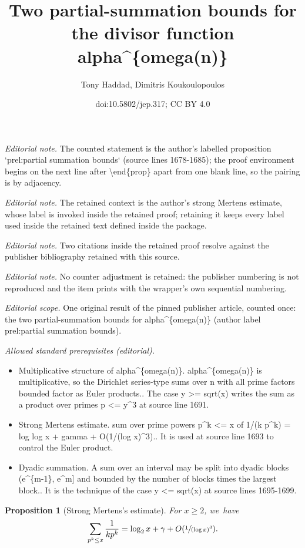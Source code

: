 \documentclass[10pt,a4paper]{article}
\title{Two partial-summation bounds for the divisor function alpha\textasciicircum{}\{omega(n)\}}
\author{Tony Haddad, Dimitris Koukoulopoulos}
\date{doi:10.5802/jep.317; CC BY 4.0}
\newcommand{\bigO}[1]{O(#1)}
\theoremstyle{plain}
\newtheorem{prop}[cor]{Proposition}
\theoremstyle{definition}
\begin{document}
\maketitle
\noindent\textit{Editorial note.} The counted statement is the author's labelled proposition `prel:partial summation bounds` (source lines 1678-1685); the proof environment begins on the next line after \textbackslash{}end\{prop\} apart from one blank line, so the pairing is by adjacency.\par\medskip
\noindent\textit{Editorial note.} The retained context is the author's strong Mertens estimate, whose label is invoked inside the retained proof; retaining it keeps every label used inside the retained text defined inside the package.\par\medskip
\noindent\textit{Editorial note.} Two citations inside the retained proof resolve against the publisher bibliography retained with this source.\par\medskip
\noindent\textit{Editorial note.} No counter adjustment is retained: the publisher numbering is not reproduced and the item prints with the wrapper's own sequential numbering.\par\medskip
\noindent\textit{Editorial scope.} One original result of the pinned publisher article, counted once: the two partial-summation bounds for alpha\textasciicircum{}\{omega(n)\} (author label prel:partial summation bounds).\par\medskip
\noindent\textit{Allowed standard prerequisites (editorial).}\begin{itemize}
\item Multiplicative structure of alpha\textasciicircum{}\{omega(n)\}. alpha\textasciicircum{}\{omega(n)\} is multiplicative, so the Dirichlet series-type sums over n with all prime factors bounded factor as Euler products.. The case y >= sqrt(x) writes the sum as a product over primes p <= y\textasciicircum{}3 at source line 1691.
\item Strong Mertens estimate. sum over prime powers p\textasciicircum{}k <= x of 1/(k p\textasciicircum{}k) = log log x + gamma + O(1/(log x)\textasciicircum{}3).. It is used at source line 1693 to control the Euler product.
\item Dyadic summation. A sum over an interval may be split into dyadic blocks (e\textasciicircum{}\{m-1\}, e\textasciicircum{}m] and bounded by the number of blocks times the largest block.. It is the technique of the case y <= sqrt(x) at source lines 1695-1699.
\end{itemize}\medskip
\begin{prop}[Strong Mertens's estimate]
\label{prop:mertens}
For $x \ge 2$, we~have
\[
\sum_{p^k \le x} \frac{1}{kp^k} = \log_2 x + \gamma + \bigO{\sfrac{1}{(\log x)^3}}.
\]
\end{prop}
\end{document}
